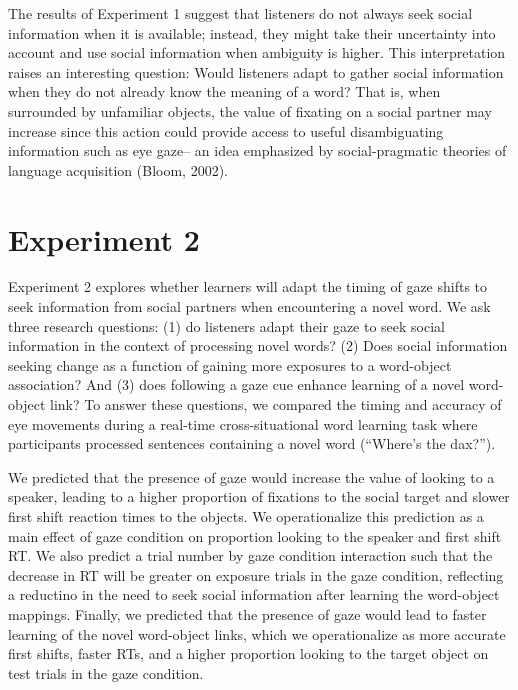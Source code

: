 \documentclass[10pt, letterpaper]{article}
\begin{document}
The results of Experiment 1 suggest that listeners do not always seek
social information when it is available; instead, they might take their
uncertainty into account and use social information when ambiguity is
higher. This interpretation raises an interesting question: Would
listeners adapt to gather social information when they do not already
know the meaning of a word? That is, when surrounded by unfamiliar
objects, the value of fixating on a social partner may increase since
this action could provide access to useful disambiguating information
such as eye gaze-- an idea emphasized by social-pragmatic theories of
language acquisition (Bloom, 2002).

\hypertarget{experiment-2}{%
\section{Experiment 2}\label{experiment-2}}

Experiment 2 explores whether learners will adapt the timing of gaze
shifts to seek information from social partners when encountering a
novel word. We ask three research questions: (1) do listeners adapt
their gaze to seek social information in the context of processing novel
words? (2) Does social information seeking change as a function of
gaining more exposures to a word-object association? And (3) does
following a gaze cue enhance learning of a novel word-object link? To
answer these questions, we compared the timing and accuracy of eye
movements during a real-time cross-situational word learning task where
participants processed sentences containing a novel word (``Where's the
dax?'').

We predicted that the presence of gaze would increase the value of
looking to a speaker, leading to a higher proportion of fixations to the
social target and slower first shift reaction times to the objects. We
operationalize this prediction as a main effect of gaze condition on
proportion looking to the speaker and first shift RT. We also predict a
trial number by gaze condition interaction such that the decrease in RT
will be greater on exposure trials in the gaze condition, reflecting a
reductino in the need to seek social information after learning the
word-object mappings. Finally, we predicted that the presence of gaze
would lead to faster learning of the novel word-object links, which we
operationalize as more accurate first shifts, faster RTs, and a higher
proportion looking to the target object on test trials in the gaze
condition.
\end{document}
